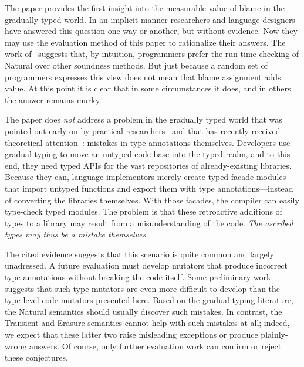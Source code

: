 
The paper provides the first insight into the measurable value of blame in the
gradually typed world. In an implicit manner researchers and language designers
have answered this question one way or another, but without evidence. Now they
may use the evaluation method of this paper to rationalize their answers.  The
work of~\citet{tgpk-dls-2018} suggests that, by intuition, programmers prefer
the run time checking of Natural over other soundness methods. But just because
a random set of programmers expresses this view does not mean that blame
assignment adds value. At this point it is clear that in some circumstances
it does, and in others the answer remains murky.

The paper does {\em not\/} address a problem in the gradually typed world that
was pointed out early on by practical researchers~\cite{incorrect-ts,
sta-nt-base-types, wmwz-ecoop-2017} and that has recently received theoretical
attention~\cite{gfd-oopsla-2019, cc-oopsla-20}: mistakes in type annotations
themselves.  Developers use gradual typing to move an untyped code base into the
typed realm, and to this end, they need typed APIs for the vast repositories of
already-existing libraries. Because they can, language implementors merely
create typed facade modules that import untyped functions and export them with
type annotations---instead of converting the libraries themselves. With those
facades, the compiler can easily type-check typed modules. The problem is
that these retroactive additions of types to a library may result from a
misunderstanding of the code. \emph{The ascribed types may thus be a mistake
themselves.}

The cited evidence suggests that this scenario is quite common and largely
unadressed.  A future evaluation must develop mutators that produce incorrect
type annotations without breaking the code itself. Some preliminary work
suggests that such type mutators are even more difficult to develop than the
type-level code mutators presented here. Based on the gradual typing literature,
the Natural semantics should usually discover such mistakes. In contrast, the
Transient and Erasure semantics cannot help with such mistakes at all; indeed,
we expect that these latter two raise misleading exceptions or produce
plainly-wrong answers.  Of course, only further evaluation work can confirm or
reject these conjectures.




